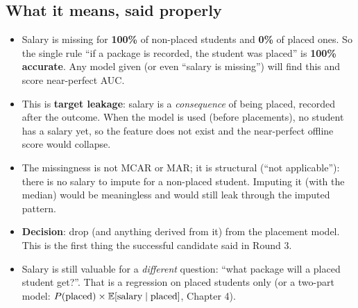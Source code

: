\subsection{What it means, said properly}
\begin{itemize}
\item Salary is missing for \textbf{100\%} of non-placed students and \textbf{0\%} of placed ones. So the single rule ``if a package is recorded, the student was placed''
  is \textbf{100\% accurate}. Any model given  (or even ``salary is missing'') will find this and score near-perfect AUC.
\item This is \textbf{target leakage}: salary is a \emph{consequence} of being placed, recorded after the outcome. When the model is used (before placements), no student has a
  salary yet, so the feature does not exist and the near-perfect offline score would collapse.
\item The missingness is not MCAR or MAR; it is structural (``not applicable''): there is no salary to impute for a non-placed student. Imputing it (with the median) would be
  meaningless and would still leak through the imputed pattern.
\item \textbf{Decision}: drop  (and anything derived from it) from the placement model. This is the first thing the successful candidate said in Round 3.
\item Salary is still valuable for a \emph{different} question: ``what package will a placed student get?''. That is a regression on placed students only (or a two-part
  model: $P(\text{placed})\times\mathbb{E}[\text{salary}\mid\text{placed}]$, Chapter 4).
\end{itemize}

